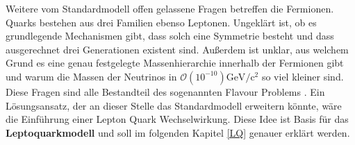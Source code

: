 Weitere vom Standardmodell offen gelassene Fragen betreffen die Fermionen. Quarks bestehen aus drei Familien ebenso Leptonen. 
Ungeklärt ist, ob es grundlegende Mechanismen gibt, dass solch eine Symmetrie besteht und dass ausgerechnet drei Generationen existent sind. Außerdem ist unklar, aus welchem Grund es eine genau festgelegte Massenhierarchie innerhalb der Fermionen gibt und warum die Massen der Neutrinos in \(\mathcal{O}( 10^{-10})\text{GeV}/\text{c}^2\) so viel kleiner sind. Diese Fragen sind alle Bestandteil des sogenannten Flavour Problems \cite{FlavourProblem}. Ein Lösungsansatz, der an dieser Stelle das Standardmodell erweitern könnte, wäre die Einführung einer Lepton Quark Wechselwirkung. Diese Idee ist Basis für das \textbf{Leptoquarkmodell} und soll im folgenden Kapitel \ref{LQ} genauer erklärt werden.  
